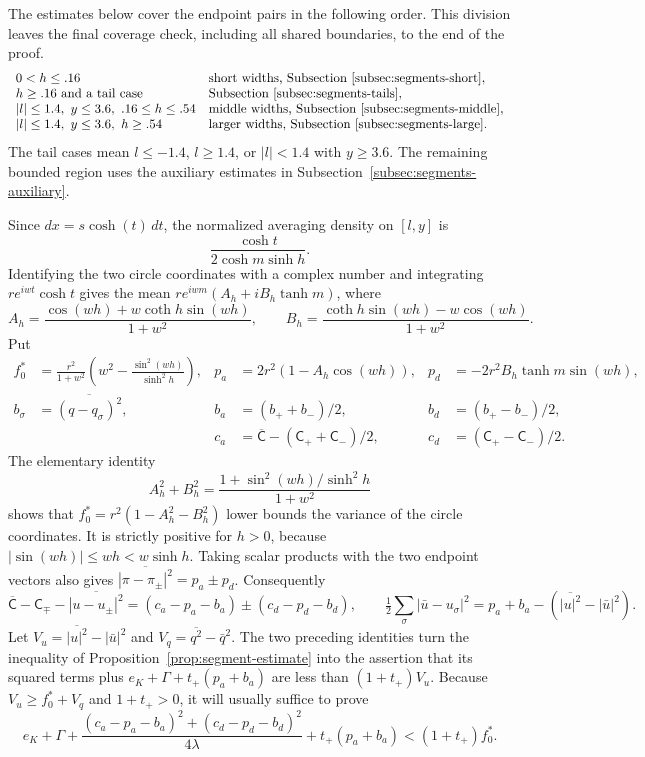 The estimates below cover the endpoint pairs in the following order.
This division leaves the final coverage check, including all shared
boundaries, to the end of the proof.
\[
\begin{array}{ll}
 0<h\le .16 & \text{short widths, Subsection~\ref{subsec:segments-short}},\\
 h\ge .16\text{ and a tail case} &
       \text{Subsection~\ref{subsec:segments-tails}},\\
 |l|\le1.4,\ y\le3.6,\ .16\le h\le.54 &
       \text{middle widths, Subsection~\ref{subsec:segments-middle}},\\
 |l|\le1.4,\ y\le3.6,\ h\ge.54 &
       \text{larger widths, Subsection~\ref{subsec:segments-large}}.
\end{array}
\]
The tail cases mean $l\le-1.4$, $l\ge1.4$, or $|l|<1.4$ with
$y\ge3.6$. The remaining bounded region uses the auxiliary estimates
in Subsection~\ref{subsec:segments-auxiliary}.

Since $dx=s\cosh(t)\,dt$, the normalized averaging density on $[l,y]$ is
\[
 \frac{\cosh t}{2\cosh m\sinh h}.
\]
Identifying the two circle coordinates with a complex number and integrating
$re^{iwt}\cosh t$ gives the mean
$re^{iwm}(A_h+iB_h\tanh m)$, where
\[
 A_h=\frac{\cos(wh)+w\coth h\sin(wh)}{1+w^2},\qquad
 B_h=\frac{\coth h\sin(wh)-w\cos(wh)}{1+w^2}.
\]
Put
\[
\begin{aligned}
 f_0^*&=\frac{r^2}{1+w^2}\left(w^2-\frac{\sin^2(wh)}{\sinh^2 h}\right),
 &p_a&=2r^2(1-A_h\cos(wh)),& p_d&=-2r^2 B_h\tanh m\sin(wh),\\
 b_\sigma&=\overline{(q-q_\sigma)^2},
 &b_a&=(b_++b_-)/2,& b_d&=(b_+-b_-)/2,\\
 &&c_a&=\overline{\mathsf C}-(\mathsf C_++\mathsf C_-)/2,& c_d&=(\mathsf C_+-\mathsf C_-)/2 .
\end{aligned}
\]
The elementary identity
\[
 A_h^2+B_h^2
 =\frac{1+\sin^2(wh)/\sinh^2h}{1+w^2}
\]
shows that $f_0^*=r^2(1-A_h^2-B_h^2)$ lower bounds the variance of the
circle coordinates. It is strictly positive for $h>0$, because
$|\sin(wh)|\le wh<w\sinh h$. Taking scalar products with the two
endpoint vectors also gives
$\overline{|\pi-\pi_\pm|^2}=p_a\pm p_d$. Consequently
\[
 \overline{\mathsf C}-\mathsf C_{\mp}-\overline{|u-u_\pm|^2}
             =(c_a-p_a-b_a)\pm(c_d-p_d-b_d),\qquad
 \tfrac12\sum_\sigma|\bar u-u_\sigma|^2
             =p_a+b_a-(\overline{|u|^2}-|\bar u|^2).
\]
Let $V_u=\overline{|u|^2}-|\bar u|^2$ and
$V_q=\overline{q^2}-\bar q^2$. The two preceding identities turn the
inequality of Proposition~\ref{prop:segment-estimate} into the assertion that its squared terms plus
$e_K+\Gamma+t_+(p_a+b_a)$ are less than $(1+t_+)V_u$.
Because $V_u\ge f_0^*+V_q$ and $1+t_+>0$, it will usually suffice to prove
\[
 e_K+\Gamma+
 \frac{(c_a-p_a-b_a)^2+(c_d-p_d-b_d)^2}{4\lambda}
 +t_+(p_a+b_a)<(1+t_+) f_0^*. \tag{s0}\label{eq:s0}
\]


